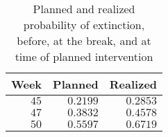 \begin{table}[tb]
\caption{Planned and realized probability of extinction, before, at the break, and
      at time of planned intervention\label{tab:min}} 
\begin{center}
\begin{tabular}{rrr}
\hline\hline
\multicolumn{1}{c}{Week}&\multicolumn{1}{c}{Planned}&\multicolumn{1}{c}{Realized}\tabularnewline
\hline
$45$&$0.2199$&$0.2853$\tabularnewline
$47$&$0.3832$&$0.4578$\tabularnewline
$50$&$0.5597$&$0.6719$\tabularnewline
\hline
\end{tabular}\end{center}
\end{table}
